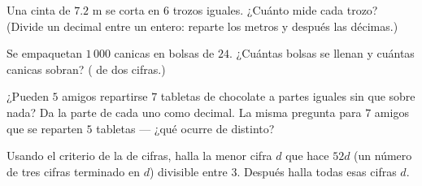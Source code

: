 \begin{exercise}[$\star$]\label{exo:g5:division:8}
Una cinta de $7.2$ m se corta en $6$ trozos iguales. ¿Cuánto mide cada
trozo? (Divide un decimal entre un entero: reparte los metros y después las
décimas.)
\end{exercise}

\begin{exercise}[$\star$]\label{exo:g5:division:9}
Se empaquetan $1\,000$ canicas en bolsas de $24$. ¿Cuántas bolsas se llenan y
cuántas canicas sobran? ( de dos cifras.)
\end{exercise}

\begin{exercise}[$\star\star$]\label{exo:g5:division:10}
¿Pueden $5$ amigos repartirse $7$ tabletas de chocolate a partes iguales sin que sobre nada?
Da la parte de cada uno como decimal. La misma pregunta para $7$ amigos que se reparten
$5$ tabletas --- ¿qué ocurre de distinto?
\end{exercise}

\begin{exercise}[$\star\star$]\label{exo:g5:division:11}
Usando el criterio de la  de cifras, halla la menor cifra $d$ que hace
$52d$ (un número de tres cifras terminado en $d$) divisible entre $3$. Después
halla todas esas cifras $d$.
\end{exercise}
